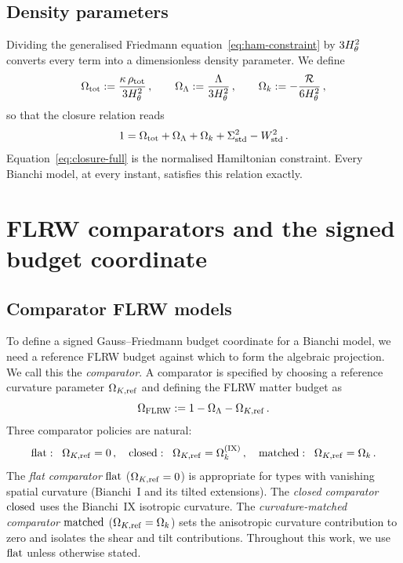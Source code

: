 \subsection{Density parameters}\label{sec:density-params}

Dividing the generalised Friedmann
equation~\eqref{eq:ham-constraint} by $3H_\theta^2$ converts
every term into a dimensionless density parameter.  We define
\begin{equation}\label{eq:density-params}
\Omega_{\mathrm{tot}} := \frac{\kappa\,\rho_{\mathrm{tot}}}{3H_\theta^2}\,,\qquad
\Omega_\Lambda := \frac{\Lambda}{3H_\theta^2}\,,\qquad
\Omega_k := -\frac{\mathcal{R}}{6H_\theta^2}\,,
\end{equation}
so that the closure relation reads
\begin{equation}\label{eq:closure-full}
1 = \Omega_{\mathrm{tot}} + \Omega_\Lambda + \Omega_k
  + \Sigma^2_{\mathrm{std}} - W^2_{\mathrm{std}}\,.
\end{equation}
Equation~\eqref{eq:closure-full} is the normalised Hamiltonian constraint.  Every Bianchi
model, at every instant, satisfies this relation exactly.


\section{FLRW comparators and the signed budget coordinate}
\label{sec:defect-def}

\subsection{Comparator FLRW models}\label{sec:comparators}

To define a signed Gauss--Friedmann budget coordinate for a Bianchi
model, we need a reference FLRW budget against which to form the
algebraic projection.  We call this the \emph{comparator}.  A comparator
is specified by choosing a reference curvature parameter
$\Omega_{K,\mathrm{ref}}$ and defining the FLRW matter budget as
\begin{equation}\label{eq:FLRW-budget}
\Omega_{\mathrm{FLRW}} := 1 - \Omega_\Lambda - \Omega_{K,\mathrm{ref}}\,.
\end{equation}
Three comparator policies are natural:
\begin{equation}\label{eq:comparator-policies}
\mathrm{flat}:\;\; \Omega_{K,\mathrm{ref}} = 0\,,\quad
\mathrm{closed}:\;\; \Omega_{K,\mathrm{ref}} = \Omega_k^{(\mathrm{IX})}\,,\quad
\mathrm{matched}:\;\; \Omega_{K,\mathrm{ref}} = \Omega_k\,.
\end{equation}
The \emph{flat comparator} $\mathrm{flat}$ ($\Omega_{K,\mathrm{ref}} = 0$) is
appropriate for types with vanishing spatial curvature (Bianchi~I
and its tilted extensions).  The \emph{closed comparator}
$\mathrm{closed}$ uses the Bianchi~IX isotropic curvature.  The
\emph{curvature-matched comparator} $\mathrm{matched}$
($\Omega_{K,\mathrm{ref}} = \Omega_k$) sets the anisotropic curvature
contribution to zero and isolates the shear and tilt
contributions.  Throughout this work, we use $\mathrm{flat}$ unless
otherwise stated.

